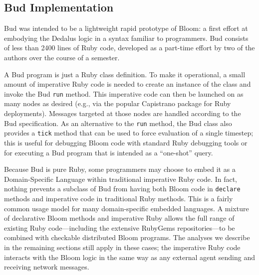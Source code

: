 \subsection{Bud Implementation}

Bud was intended to be a lightweight rapid prototype of Bloom: a first effort at embodying the Dedalus logic in a syntax familiar to programmers.  Bud consists of less than 2400 lines of Ruby code, developed as a part-time effort by two of the authors over the course of a semester.


A Bud program is just a Ruby class definition.  To make it operational, a small
amount of imperative Ruby code is needed to create an instance of the class and
invoke the Bud \texttt{run} method.  This imperative code can then be launched
on as many nodes as desired (e.g., via the popular Capistrano package for Ruby
deployments).  Messages targeted at those nodes are handled according to the Bud
specification.  As an alternative to the \texttt{run} method, the Bud class also
provides a \texttt{tick} method that can be used to force evaluation of a single
timestep; this is useful for debugging Bloom code with standard Ruby debugging
tools or for executing a Bud program that is intended as a ``one-shot'' query.

Because Bud is pure Ruby, some programmers may choose to embed it as a
Domain-Specific Language within traditional imperative Ruby code.  In fact,
nothing prevents a subclass of Bud from having both Bloom code in
\texttt{declare} methods and imperative code in traditional Ruby methods.  This
is a fairly common usage model for many domain-specific embedded languages. A
mixture of declarative Bloom methods and imperative Ruby allows the full range
of existing Ruby code---including the extensive RubyGems repositories---to be
combined with checkable distributed Bloom programs. The analyses we describe in
the remaining sections still apply in these cases; the imperative Ruby code
interacts with the Bloom logic in the same way as any external agent sending and
receiving network messages.
